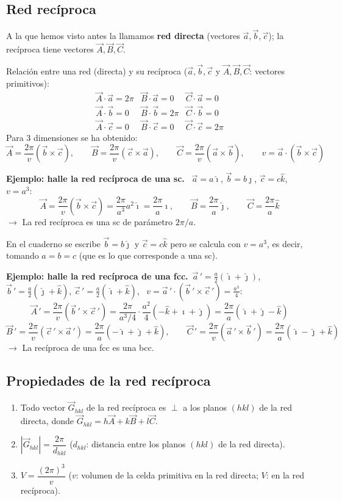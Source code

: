 \documentclass[11pt,a4paper]{article}
\newcommand{\ii}{\hat{\imath}}
\newcommand{\jj}{\hat{\jmath}}
\newcommand{\kk}{\hat{k}}
\begin{document}
\subsection{Red recíproca}
A la que hemos visto antes la llamamos \textbf{red directa} (vectores $\vec a,\vec b,\vec c$); la recíproca tiene vectores $\vec A,\vec B,\vec C$.

Relación entre una red (directa) y su recíproca ($\vec a,\vec b,\vec c$ y $\vec A,\vec B,\vec C$: vectores primitivos):
\[
\begin{array}{lll}
\vec A\cdot\vec a=2\pi & \vec B\cdot\vec a=0 & \vec C\cdot\vec a=0\\
\vec A\cdot\vec b=0 & \vec B\cdot\vec b=2\pi & \vec C\cdot\vec b=0\\
\vec A\cdot\vec c=0 & \vec B\cdot\vec c=0 & \vec C\cdot\vec c=2\pi
\end{array}
\]
Para 3 dimensiones se ha obtenido:
\[
\vec A=\frac{2\pi}{v}(\vec b\times\vec c),\qquad \vec B=\frac{2\pi}{v}(\vec c\times\vec a),\qquad \vec C=\frac{2\pi}{v}(\vec a\times\vec b),\qquad
v=\vec a\cdot(\vec b\times\vec c)
\]

\textbf{Ejemplo: halle la red recíproca de una sc.} \ $\vec a=a\ii$, $\vec b=b\jj$, $\vec c=c\kk$, \ $v=a^3$:
\[
\vec A=\frac{2\pi}{v}(\vec b\times\vec c)=\frac{2\pi}{a^3}a^2\ii=\frac{2\pi}{a}\ii,\qquad
\vec B=\frac{2\pi}{a}\jj,\qquad \vec C=\frac{2\pi}{a}\kk
\]
$\rightarrow$ La red recíproca es una sc de parámetro $2\pi/a$.

\begin{obs}
En el cuaderno se escribe $\vec b=b\jj$ y $\vec c=c\kk$ pero se calcula con $v=a^3$, es decir, tomando $a=b=c$ (que es lo
que corresponde a una sc).
\end{obs}

\textbf{Ejemplo: halle la red recíproca de una fcc.}\
$\vec a\,'=\frac a2(\ii+\jj)$, $\vec b\,'=\frac a2(\jj+\kk)$, $\vec c\,'=\frac a2(\ii+\kk)$, \ $v=\vec a\,'\cdot(\vec b\,'\times\vec c\,')=\frac{a^3}{4}$:
\[
\vec A\,'=\frac{2\pi}{v}(\vec b\,'\times\vec c\,')=\frac{2\pi}{a^3/4}\cdot\frac{a^2}{4}(-\kk+\ii+\jj)=\frac{2\pi}{a}(\ii+\jj-\kk)
\]
\[
\vec B\,'=\frac{2\pi}{v}(\vec c\,'\times\vec a\,')=\frac{2\pi}{a}(-\ii+\jj+\kk),\qquad
\vec C\,'=\frac{2\pi}{v}(\vec a\,'\times\vec b\,')=\frac{2\pi}{a}(\ii-\jj+\kk)
\]
$\rightarrow$ La recíproca de una fcc es una bcc.

\subsection{Propiedades de la red recíproca}
\begin{enumerate}
  \item Todo vector $\vec G_{hkl}$ de la red recíproca es $\perp$ a los planos $(hkl)$ de la red directa, donde
        $\vec G_{hkl}=h\vec A+k\vec B+l\vec C$.
  \item $|\vec G_{hkl}|=\dfrac{2\pi}{d_{hkl}}$ \quad ($d_{hkl}$: distancia entre los planos $(hkl)$ de la red directa).
  \item $V=\dfrac{(2\pi)^3}{v}$ \quad ($v$: volumen de la celda primitiva en la red directa; $V$: en la red recíproca).
\end{enumerate}
\end{document}
